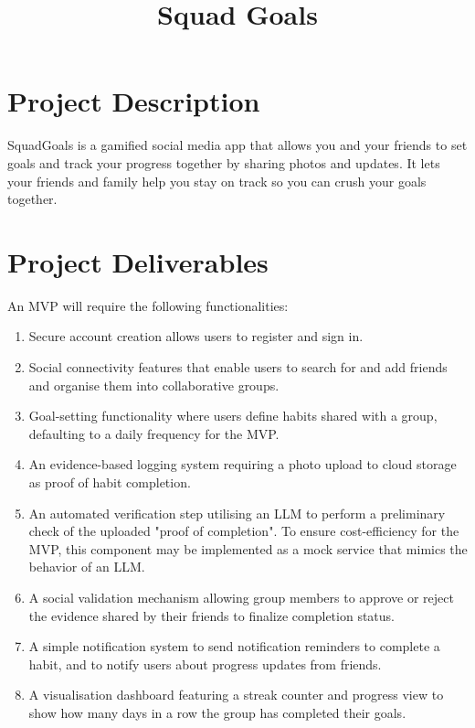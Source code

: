 \title{Squad Goals}

\maketitle
\section*{Project Description}
SquadGoals is a gamified social media app that allows you and your friends to set goals and track your progress together by sharing photos and updates. 
It lets your friends and family help you stay on track so you can crush your goals together.
\section*{Project Deliverables}
An MVP will require the following functionalities:
\begin{enumerate}
\item Secure account creation allows users to register and sign in.
\item Social connectivity features that enable users to search for and add friends and organise them into collaborative groups. 
\item Goal-setting functionality where users define habits shared with a group, defaulting to a daily frequency for the MVP. 
\item An evidence-based logging system requiring a photo upload to cloud storage as proof of habit completion. 
\item An automated verification step utilising an LLM to perform a preliminary check of the uploaded "proof of completion". To ensure cost-efficiency for the MVP, this component may be implemented as a mock service that mimics the behavior of an LLM.
\item A social validation mechanism allowing group members to approve or reject the evidence shared by their friends to finalize completion status. 
\item A simple notification system to send notification reminders to complete a habit, and to notify users about progress updates from friends.
\item A visualisation dashboard featuring a streak counter and progress view to show how many days in a row the group has completed their goals.
\end{enumerate}

